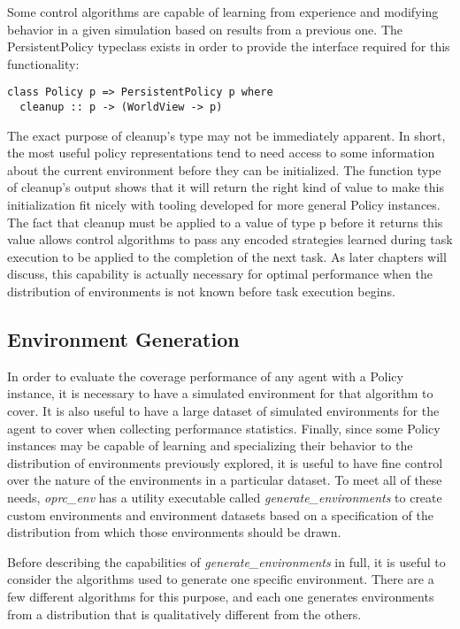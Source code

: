 Some control algorithms are capable of learning from experience and modifying behavior in a given simulation based on results from a previous one. The PersistentPolicy typeclass exists in order to provide the interface required for this functionality:

\begin{verbatim}
class Policy p => PersistentPolicy p where
  cleanup :: p -> (WorldView -> p)
\end{verbatim}

The exact purpose of cleanup's type may not be immediately apparent. In short, the most useful policy representations tend to need access to some information about the current environment before they can be initialized. The function type of cleanup's output shows that it will return the right kind of value to make this initialization fit nicely with tooling developed for more general Policy instances. The fact that cleanup must be applied to a value of type p before it returns this value allows control algorithms to pass any encoded strategies learned during task execution to be applied to the completion of the next task. As later chapters will discuss, this capability is actually necessary for optimal performance when the distribution of environments is not known before task execution begins.

\subsection{Environment Generation}

In order to evaluate the coverage performance of any agent with a Policy instance, it is necessary to have a simulated environment for that algorithm to cover. It is also useful to have a large dataset of simulated environments for the agent to cover when collecting performance statistics. Finally, since some Policy instances may be capable of learning and specializing their behavior to the distribution of environments previously explored, it is useful to have fine control over the nature of the environments in a particular dataset. To meet all of these needs, \textit{oprc\_env} has a utility executable called \textit{generate\_environments} to create custom environments and environment datasets based on a specification of the distribution from which those environments should be drawn.

Before describing the capabilities of \textit{generate\_environments} in full, it is useful to consider the algorithms used to generate one specific environment. There are a few different algorithms for this purpose, and each one generates environments from a distribution that is qualitatively different from the others.

